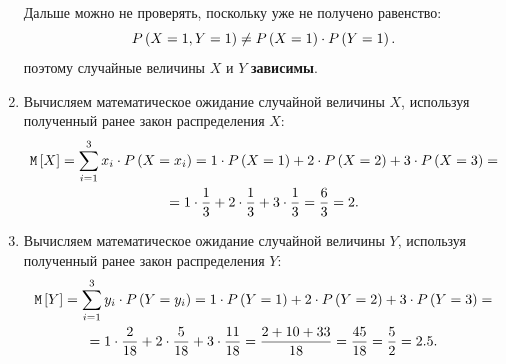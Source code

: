 \documentclass[12pt,a4paper]{article}
\begin{document}
\begin{enumerate}
        Дальше можно не проверять, поскольку уже не получено равенство:
        \begin{equation}
            P \left ( X=1, Y=1 \right ) \neq P \left ( X=1 \right ) \cdot P \left ( Y=1 \right ) .
        \end{equation}
        поэтому случайные величины $X$ и $Y$ \textbf{зависимы}.

        \item Вычисляем математическое ожидание случайной величины $X$, используя полученный ранее закон распределения $X$:
        \begin{multline}
            \mathtt{M} \left [ X \right ] = \sum_{i=1}^3 x_i \cdot P \left ( X=x_i \right )
            = 1 \cdot P \left ( X=1 \right ) + 2 \cdot P \left ( X=2 \right ) + 3 \cdot P \left ( X=3 \right ) = \\
            = 1 \cdot \frac{1}{3} + 2 \cdot \frac{1}{3} + 3 \cdot \frac{1}{3}
            = \frac{6}{3} = 2
            .
        \end{multline}

        \item Вычисляем математическое ожидание случайной величины $Y$, используя полученный ранее закон распределения $Y$:
        \begin{multline}
            \mathtt{M} \left [ Y \right ] = \sum_{i=1}^3 y_i \cdot P \left ( Y=y_i \right )
            = 1 \cdot P \left ( Y=1 \right ) + 2 \cdot P \left ( Y=2 \right ) + 3 \cdot P \left ( Y=3 \right ) = \\
            = 1 \cdot \frac{2}{18} + 2 \cdot \frac{5}{18} + 3 \cdot \frac{11}{18}
            = \frac{2 + 10 + 33}{18} = \frac{45}{18} = \frac{5}{2} = 2.5
            .
        \end{multline}


\end{enumerate}
\end{document}
